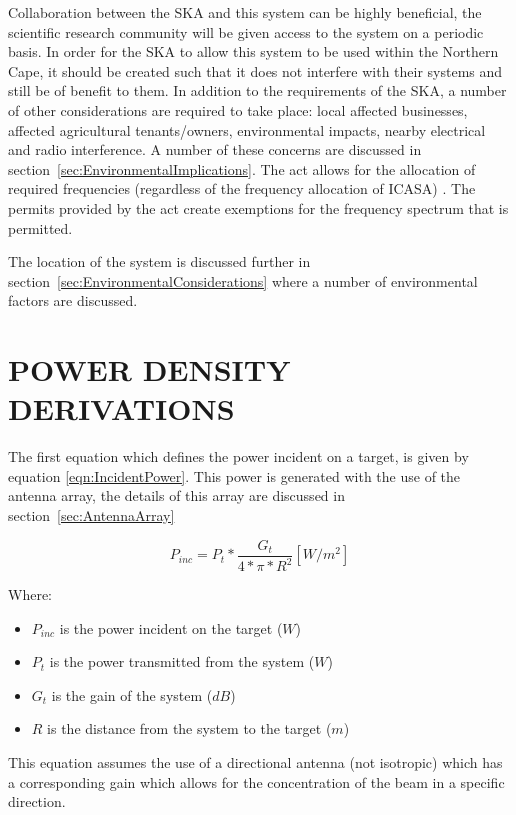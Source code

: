 \documentclass[11pt]{witseiepaper}
\begin{document}
\begin{bibunit}[witseie]
Collaboration between the SKA and this system can be highly beneficial, the scientific research community will be given access to the system on a periodic basis. In order for the SKA to allow this system to be used within the Northern Cape, it should be created such that it does not interfere with their systems and still be of benefit to them. In addition to the requirements of the SKA, a number of other considerations are required to take place: local affected businesses, affected agricultural tenants/owners, environmental impacts, nearby electrical and radio interference. A number of these concerns are discussed in section~\ref{sec:EnvironmentalImplications}.
The act allows for the allocation of required frequencies (regardless of the frequency allocation of ICASA) \cite{SKAAct}. The permits provided by the act create exemptions for the frequency spectrum that is permitted.

The location of the system is discussed further in section~\ref{sec:EnvironmentalConsiderations} where a number of environmental factors are discussed.

\section{POWER DENSITY DERIVATIONS} \label{sec:PowerDensityDerivations}
The first equation which defines the power incident on a target, is given by equation \ref{eqn:IncidentPower}. This power is generated with the use of the antenna array, the details of this array are discussed in section~\ref{sec:AntennaArray}

\begin{equation} \label{eqn:IncidentPower}
P_{inc} = P_t * \frac{G_{t}}{4 * \pi * R^2} [W/m^2]
\end{equation}

Where:
\begin{itemize}
    \item $P_{inc}$ is the power incident on the target ($W$)
    \item $P_t$ is the power transmitted from the system ($W$)
    \item $G_t$ is the gain of the system ($dB$)
    \item $R$ is the distance from the system to the target ($m$)
\end{itemize}

This equation assumes the use of a directional antenna (not isotropic) which has a corresponding gain which allows for the concentration of the beam in a specific direction.


\end{bibunit}
\end{document}

